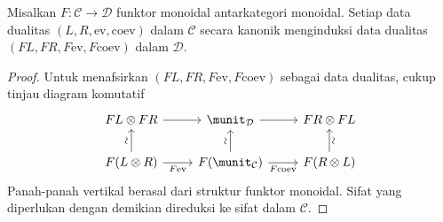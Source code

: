 \begin{proposition}\label{prop:monoidal-functor-dual}
	Misalkan $F:\mathcal{C}\to\mathcal{D}$ funktor monoidal antarkategori
	monoidal. Setiap data dualitas $(L,R,\mathrm{ev},\mathrm{coev})$ dalam
	$\mathcal{C}$ secara kanonik menginduksi data dualitas
	$(FL,FR,F\mathrm{ev},F\mathrm{coev})$ dalam $\mathcal{D}$.
\end{proposition}
\begin{proof}
	Untuk menafsirkan $(FL,FR,F\mathrm{ev},F\mathrm{coev})$ sebagai data
	dualitas, cukup tinjau diagram komutatif
	\[\begin{tikzcd}
		FL \otimes FR \arrow[r] & \munit_{\mathcal{D}} \arrow[r] & FR \otimes FL \\
		F(L \otimes R) \arrow[r, "{F\mathrm{ev}}"'] \arrow[u, "\sim" sloped] & F(\munit_{\mathcal{C}}) \arrow[u, "\sim" sloped] \arrow[r, "{F\mathrm{coev}}"'] & F(R \otimes L) \arrow[u, "\sim"' sloped]
	\end{tikzcd}\]
	Panah-panah vertikal berasal dari struktur funktor monoidal. Sifat yang
	diperlukan dengan demikian direduksi ke sifat dalam $\mathcal{C}$.
\end{proof}

